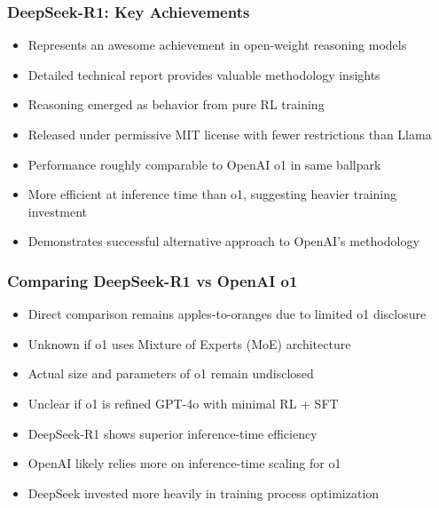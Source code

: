 \begin{frame}[fragile]\frametitle{DeepSeek-R1: Key Achievements}
      \begin{itemize}
	\item Represents an awesome achievement in open-weight reasoning models
	\item Detailed technical report provides valuable methodology insights
	\item Reasoning emerged as behavior from pure RL training
	\item Released under permissive MIT license with fewer restrictions than Llama
	\item Performance roughly comparable to OpenAI o1 in same ballpark
	\item More efficient at inference time than o1, suggesting heavier training investment
	\item Demonstrates successful alternative approach to OpenAI's methodology
	  \end{itemize}
\end{frame}

\begin{frame}[fragile]\frametitle{Comparing DeepSeek-R1 vs OpenAI o1}
      \begin{itemize}
	\item Direct comparison remains apples-to-oranges due to limited o1 disclosure
	\item Unknown if o1 uses Mixture of Experts (MoE) architecture
	\item Actual size and parameters of o1 remain undisclosed
	\item Unclear if o1 is refined GPT-4o with minimal RL + SFT
	\item DeepSeek-R1 shows superior inference-time efficiency
	\item OpenAI likely relies more on inference-time scaling for o1
	\item DeepSeek invested more heavily in training process optimization
	  \end{itemize}
\end{frame}


